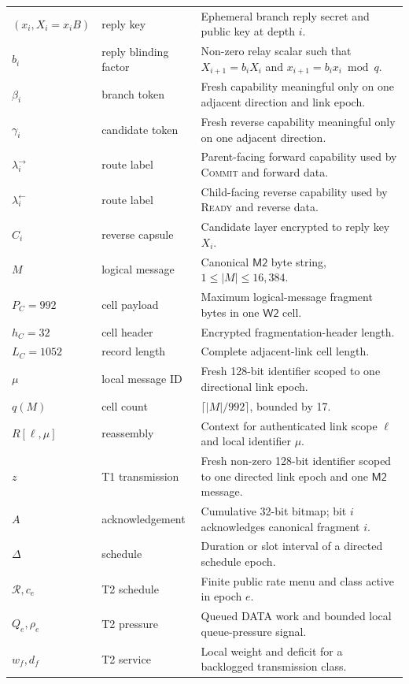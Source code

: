 \documentclass[11pt,oneside]{article}
\newcommand{\Mtwo}{\ensuremath{\mathsf{M2}}}
\newcommand{\Wtwo}{\ensuremath{\mathsf{W2}}}
\begin{document}
\begin{longtable}{@{}p{}p{}p{}@{}}
$(x_i,X_i=x_iB)$ & reply key & Ephemeral branch reply secret and public key at depth $i$. \\
$b_i$ & reply blinding factor & Non-zero relay scalar such that $X_{i+1}=b_iX_i$ and $x_{i+1}=b_ix_i\bmod q$. \\
$\beta_i$ & branch token & Fresh capability meaningful only on one adjacent direction and link epoch. \\
$\gamma_i$ & candidate token & Fresh reverse capability meaningful only on one adjacent direction. \\
$\lambda_i^{\rightarrow}$ & route label & Parent-facing forward capability used by \textsc{Commit} and forward data. \\
$\lambda_i^{\leftarrow}$ & route label & Child-facing reverse capability used by \textsc{Ready} and reverse data. \\
$C_i$ & reverse capsule & Candidate layer encrypted to reply key $X_i$. \\
$M$ & logical message & Canonical \Mtwo{} byte string, $1\le|M|\le16{,}384$. \\
$P_C=992$ & cell payload & Maximum logical-message fragment bytes in one \Wtwo{} cell. \\
$h_C=32$ & cell header & Encrypted fragmentation-header length. \\
$L_C=1052$ & record length & Complete adjacent-link cell length. \\
$\mu$ & local message ID & Fresh 128-bit identifier scoped to one directional link epoch. \\
$q(M)$ & cell count & $\lceil |M|/992\rceil$, bounded by 17. \\
$R[\ell,\mu]$ & reassembly & Context for authenticated link scope $\ell$ and local identifier $\mu$. \\
$z$ & T1 transmission & Fresh non-zero 128-bit identifier scoped to one directed link epoch and one \Mtwo{} message. \\
$A$ & acknowledgement & Cumulative 32-bit bitmap; bit $i$ acknowledges canonical fragment $i$. \\
$\Delta$ & schedule & Duration or slot interval of a directed schedule epoch. \\
$\mathcal{R},c_e$ & T2 schedule & Finite public rate menu and class active in epoch $e$. \\
$Q_e,\rho_e$ & T2 pressure & Queued DATA work and bounded local queue-pressure signal. \\
$w_f,d_f$ & T2 service & Local weight and deficit for a backlogged transmission class. \\

\end{longtable}
\end{document}
